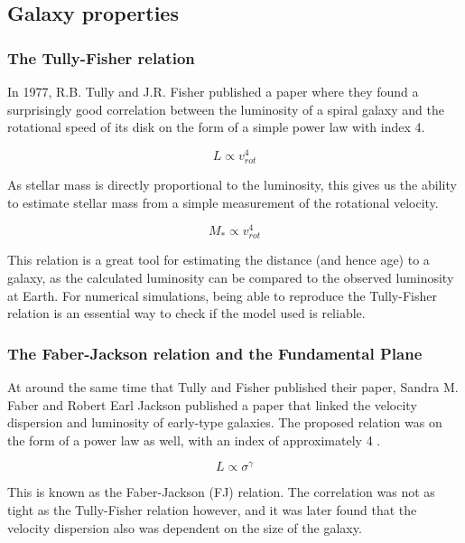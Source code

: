 \subsection{Galaxy properties}


\subsubsection{The Tully-Fisher relation}

In 1977, R.B. Tully and J.R. Fisher \parencite{TullyFisher1977} published a paper where they found a surprisingly good correlation between the luminosity of a spiral galaxy and the rotational speed of its disk on the form of a simple power law with index 4.

\begin{equation}
    L \propto v_{rot}^4 
\end{equation}

As stellar mass is directly proportional to the luminosity, this gives us the ability to estimate stellar mass from a simple measurement of the rotational velocity.

\begin{equation}
    M_* \propto v_{rot}^4 
\end{equation}

This relation is a great tool for estimating the distance (and hence age) to a galaxy, as the calculated luminosity can be compared to the observed luminosity at Earth. For numerical simulations, being able to reproduce the Tully-Fisher relation is an essential way to check if the model used is reliable.

\subsubsection{The Faber-Jackson relation and the Fundamental Plane}
At around the same time that Tully and Fisher published their paper, Sandra M. Faber and Robert Earl Jackson published a paper that linked the velocity dispersion and luminosity of early-type galaxies. The proposed relation was on the form of a power law as well, with an index of approximately 4 \parencite{FaberJackson1976}.

\begin{equation}
    L \propto \sigma^{\gamma} 
\end{equation}

This is known as the Faber-Jackson (FJ) relation. The correlation was not as tight as the Tully-Fisher relation however, and it was later found that the velocity dispersion also was dependent on the size of the galaxy.

